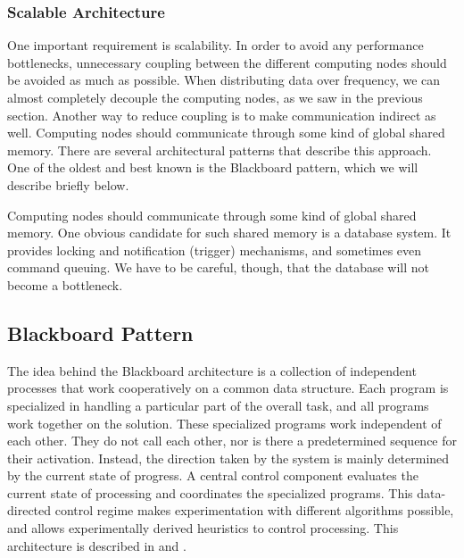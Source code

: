 \documentclass[10pt]{lofar}
\begin{document}
\subsubsection{Scalable Architecture}
\label{subsubsec:scalable-architecture}
One important requirement is scalability. In order to avoid any performance
bottlenecks, unnecessary coupling between the different computing nodes should
be avoided as much as possible. When distributing data over frequency, we can
almost completely decouple the computing nodes, as we saw in the previous
section. Another way to reduce coupling is to make communication indirect as
well. Computing nodes should communicate through some kind of global shared
memory. There are several architectural patterns that describe this
approach. One of the oldest and best known is the Blackboard pattern, which we
will describe briefly below.

Computing nodes should communicate through some kind of global shared
memory. One obvious candidate for such shared memory is a database system. It
provides locking and notification (trigger) mechanisms, and sometimes even
command queuing. We have to be careful, though, that the database will not
become a bottleneck.

\subsection{Blackboard Pattern}
\label{subsec:blackboard}
The idea behind the Blackboard architecture is a collection of independent
processes that work cooperatively on a common data structure. Each program is
specialized in handling a particular part of the overall task, and all
programs work together on the solution. These specialized programs work
independent of each other. They do not call each other, nor is there a
predetermined sequence for their activation. Instead, the direction taken by
the system is mainly determined by the current state of progress. A central
control component evaluates the current state of processing and coordinates
the specialized programs. This data-directed control regime makes
experimentation with different algorithms possible, and allows experimentally
derived heuristics to control processing. This architecture is described in
\cite{Buschmann1996} and \cite{LOFAR-ASTRON-SDD-002}.
\end{document}
